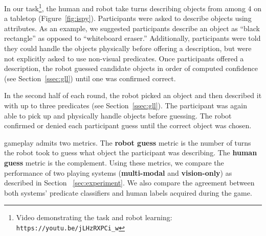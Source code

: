In our \ispy task\footnote{Video demonstrating the \ispy task and robot learning: \texttt{https://youtu.be/jLHzRXPCi\_w}}, the human and robot take turns describing objects from among 4 on a tabletop (Figure~\ref{fig:ispy}).
Participants were asked to describe objects using attributes.
As an example, we suggested participants describe an object as ``black rectangle'' as opposed to ``whiteboard eraser.''
Additionally, participants were told they could handle the objects physically before offering a description, but were not explicitly asked to use non-visual predicates.
Once participants offered a description, the robot guessed candidate objects in order of computed confidence (see Section~\ref{ssec:gll}) until one was confirmed correct.

In the second half of each round, the robot picked an object and then described it with up to three predicates (see Section~\ref{ssec:gll}).
The participant was again able to pick up and physically handle objects before guessing.
The robot confirmed or denied each participant guess until the correct object was chosen.

\ispy gameplay admits two metrics.
The \textbf{robot guess} metric is the number of turns the robot took to guess what object the participant was describing.
The \textbf{human guess} metric is the complement.
Using these metrics, we compare the performance of two \ispy playing systems (\textbf{multi-modal} and \textbf{vision-only}) as described in Section ~\ref{sec:experiment}.
We also compare the agreement between both systems' predicate classifiers and human labels acquired during the game.